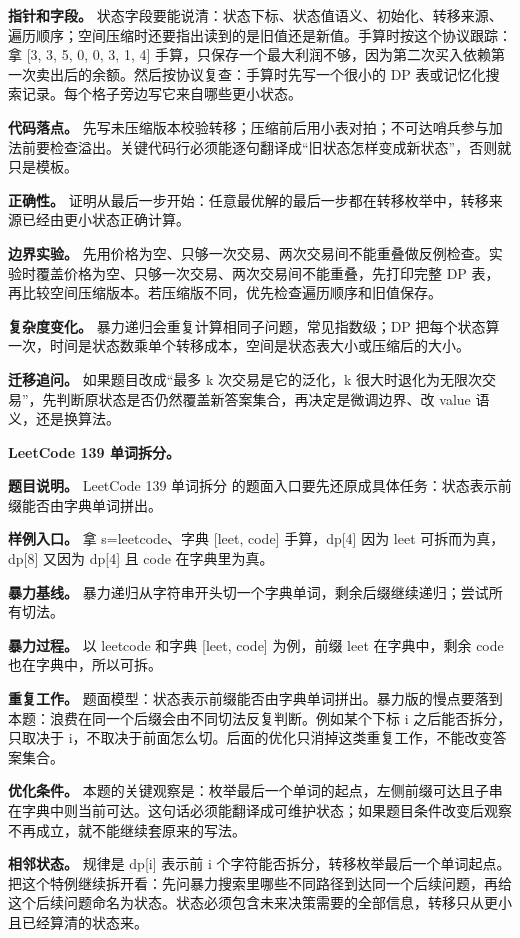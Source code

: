 \textbf{指针和字段。} 状态字段要能说清：状态下标、状态值语义、初始化、转移来源、遍历顺序；空间压缩时还要指出读到的是旧值还是新值。手算时按这个协议跟踪：拿 [3, 3, 5, 0, 0, 3, 1, 4] 手算，只保存一个最大利润不够，因为第二次买入依赖第一次卖出后的余额。然后按协议复查：手算时先写一个很小的 DP 表或记忆化搜索记录。每个格子旁边写它来自哪些更小状态。

\textbf{代码落点。} 先写未压缩版本校验转移；压缩前后用小表对拍；不可达哨兵参与加法前要检查溢出。关键代码行必须能逐句翻译成“旧状态怎样变成新状态”，否则就只是模板。

\textbf{正确性。} 证明从最后一步开始：任意最优解的最后一步都在转移枚举中，转移来源已经由更小状态正确计算。

\textbf{边界实验。} 先用价格为空、只够一次交易、两次交易间不能重叠做反例检查。实验时覆盖价格为空、只够一次交易、两次交易间不能重叠，先打印完整 DP 表，再比较空间压缩版本。若压缩版不同，优先检查遍历顺序和旧值保存。

\textbf{复杂度变化。} 暴力递归会重复计算相同子问题，常见指数级；DP 把每个状态算一次，时间是状态数乘单个转移成本，空间是状态表大小或压缩后的大小。

\textbf{迁移追问。} 如果题目改成“最多 k 次交易是它的泛化，k 很大时退化为无限次交易”，先判断原状态是否仍然覆盖新答案集合，再决定是微调边界、改 value 语义，还是换算法。

\noindent\textbf{LeetCode 139 单词拆分。}

\textbf{题目说明。} LeetCode 139 单词拆分 的题面入口要先还原成具体任务：状态表示前缀能否由字典单词拼出。

\textbf{样例入口。} 拿 s=leetcode、字典 [leet, code] 手算，dp[4] 因为 leet 可拆而为真，dp[8] 又因为 dp[4] 且 code 在字典里为真。

\textbf{暴力基线。} 暴力递归从字符串开头切一个字典单词，剩余后缀继续递归；尝试所有切法。

\textbf{暴力过程。} 以 leetcode 和字典 [leet, code] 为例，前缀 leet 在字典中，剩余 code 也在字典中，所以可拆。

\textbf{重复工作。} 题面模型：状态表示前缀能否由字典单词拼出。暴力版的慢点要落到本题：浪费在同一个后缀会由不同切法反复判断。例如某个下标 i 之后能否拆分，只取决于 i，不取决于前面怎么切。后面的优化只消掉这类重复工作，不能改变答案集合。

\textbf{优化条件。} 本题的关键观察是：枚举最后一个单词的起点，左侧前缀可达且子串在字典中则当前可达。这句话必须能翻译成可维护状态；如果题目条件改变后观察不再成立，就不能继续套原来的写法。

\textbf{相邻状态。} 规律是 dp[i] 表示前 i 个字符能否拆分，转移枚举最后一个单词起点。把这个特例继续拆开看：先问暴力搜索里哪些不同路径到达同一个后续问题，再给这个后续问题命名为状态。状态必须包含未来决策需要的全部信息，转移只从更小且已经算清的状态来。

